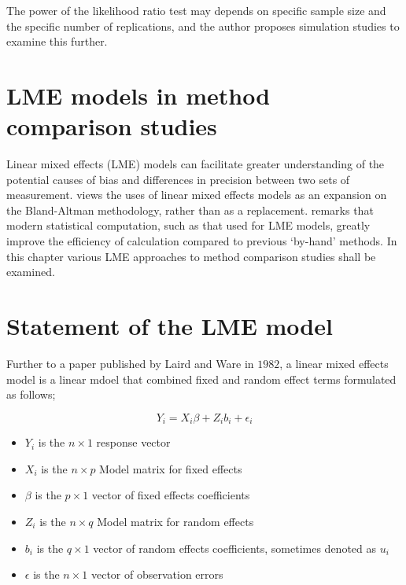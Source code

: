 \documentclass[12pt, a4paper]{report}
\theoremstyle{plain}
\theoremstyle{definition}
\theoremstyle{remark}
\begin{document}
The power of the
likelihood ratio test may depends on specific sample size and the
specific number of  replications, and the author proposes
simulation studies to examine this further.



\section{LME models in method comparison studies}

Linear mixed effects (LME) models can facilitate greater
understanding of the potential causes of bias and differences in
precision between two sets of measurement. \citet{LaiShiao} views
the uses of linear mixed effects models as an expansion on the
Bland-Altman methodology, rather than as a replacement.
\citet{BXC2008} remarks that modern statistical computation, such
as that used for LME models, greatly improve the efficiency of
calculation compared to previous `by-hand' methods. In this
chapter various LME approaches to method comparison studies shall
be examined.



\section{Statement of the LME model}

Further to a paper published by Laird and Ware in $1982$, a linear mixed effects model is a linear mdoel that combined fixed and random effect terms formulated as follows;

\begin{displaymath}
Y_{i} =X_{i}\beta + Z_{i}b_{i} + \epsilon_{i}
\end{displaymath}
\begin{itemize}
	
	\item $Y_{i}$ is the $n \times 1$ response vector \item $X_{i}$ is
	the $n \times p$ Model matrix for fixed effects \item $\beta$ is
	the $p \times 1$ vector of fixed effects coefficients \item
	$Z_{i}$ is the $n \times q$ Model matrix for random effects \item
	$b_{i}$ is the $q \times 1$ vector of random effects coefficients,
	sometimes denoted as $u_{i}$ \item $\epsilon$ is the $n \times 1$
	vector of observation errors
\end{itemize}
\end{document}
